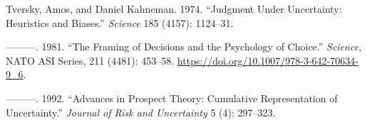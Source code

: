 \documentclass[
]{book}
\newlength{\cslhangindent}
\newlength{\cslentryspacingunit} %
\newenvironment{CSLReferences}[2] %
 {%
  \setlength{\parindent}{0pt}
  \ifodd #1
  \let\oldpar\par
  \def\par{\hangindent=\cslhangindent\oldpar}
  \fi
  \setlength{\parskip}{#2\cslentryspacingunit}
 }%
 {}
\begin{document}
\begin{CSLReferences}{1}{0}
\leavevmode{}%
Tversky, Amos, and Daniel Kahneman. 1974. {``Judgment Under Uncertainty: {Heuristics} and Biases.''} \emph{Science} 185 (4157): 1124--31.

\leavevmode{}%
---------. 1981. {``The {Framing} of {Decisions} and the {Psychology} of {Choice}.''} \emph{Science}, {NATO ASI Series}, 211 (4481): 453--58. \url{https://doi.org/10.1007/978-3-642-70634-9_6}.

\leavevmode{}%
---------. 1992. {``Advances in Prospect Theory: {Cumulative} Representation of Uncertainty.''} \emph{Journal of Risk and Uncertainty} 5 (4): 297--323.

\end{CSLReferences}

\backmatter
\end{document}
